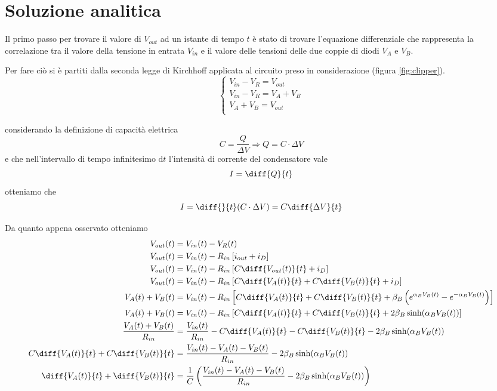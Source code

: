 \raggedbottom
\chapter{Soluzione analitica}
	Il primo passo per trovare il valore di $V_{out}$ ad un istante di tempo $t$ è stato di trovare l'equazione differenziale che rappresenta la correlazione tra il valore della tensione in entrata $V_{in}$ e il valore delle tensioni delle due coppie di diodi $V_{A}$ e $V_{B}$.
	
	Per fare ciò si è partiti dalla seconda legge di Kirchhoff applicata al circuito preso in considerazione (figura \ref{fig:clipper}).
	\[
	\begin{cases}
		V_{in}-V_{R} = V_{out}\\
		V_{in}-V_{R} = V_{A}+V_{B}\\
		V_{A}+V_{B} = V_{out}\\
	\end{cases}
	\]
	
	considerando la definizione di capacità elettrica
	\[
		C = \frac{Q}{\Delta V} \Rightarrow Q = C \cdot \Delta V
	\]
	e che nell'intervallo di tempo infinitesimo $\mathrm{d}t$ l'intensità di corrente del condensatore vale 
	\[
		I = \diff{Q}{t}
	\]
	otteniamo che
	\[
		I = \diff{}{t}(C \cdot \Delta V) = C\diff{\Delta V}{t}
	\]
	\pagebreak
	
	Da quanto appena osservato otteniamo
	\begin{equation}
		\label{eq:differenziale}
		\begin{split}
			V_{out}(t) &= V_{in}(t)-V_{R}(t)\\
			V_{out}(t) &= V_{in}(t)-R_{in}\left[i_{out}+i_{D}\right]\\
			V_{out}(t) &= V_{in}(t)-R_{in}\left[C\diff{V_{out}(t)}{t}+i_{D}\right]\\
			V_{out}(t) &= V_{in}(t)-R_{in}\left[C\diff{V_{A}(t)}{t}+C\diff{V_{B}(t)}{t}+i_{D}\right]\\
			V_{A}(t)+V_{B}(t) &= V_{in}(t)-R_{in}\left[C\diff{V_{A}(t)}{t}+C\diff{V_{B}(t)}{t}+\beta_{B}\left(e^{\alpha_{B}V_{B}(t)}-e^{-\alpha_{B}V_{B}(t)}\right)\right]\\
			V_{A}(t)+V_{B}(t) &= V_{in}(t)-R_{in}\left[C\diff{V_{A}(t)}{t}+C\diff{V_{B}(t)}{t}+2\beta_{B}\sinh(\alpha_{B}V_{B}(t))\right]\\
			\frac{V_{A}(t)+V_{B}(t)}{R_{in}} &= \frac{V_{in}(t)}{R_{in}}-C\diff{V_{A}(t)}{t}-C\diff{V_{B}(t)}{t}-2\beta_{B}\sinh(\alpha_{B}V_{B}(t))\\
			C\diff{V_{A}(t)}{t}+C\diff{V_{B}(t)}{t} &= \frac{V_{in}(t)-V_{A}(t)-V_{B}(t)}{R_{in}}-2\beta_{B}\sinh(\alpha_{B}V_{B}(t))\\
			\diff{V_{A}(t)}{t}+\diff{V_{B}(t)}{t} &= \frac{1}{C}\left(\frac{V_{in}(t)-V_{A}(t)-V_{B}(t)}{R_{in}}-2\beta_{B}\sinh(\alpha_{B}V_{B}(t))\right)\\
		\end{split}
	\end{equation}
	\pagebreak
	
